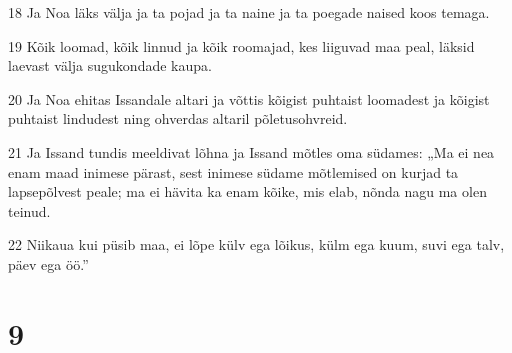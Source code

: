 \par 18 Ja Noa läks välja ja ta pojad ja ta naine ja ta poegade naised koos temaga.
\par 19 Kõik loomad, kõik linnud ja kõik roomajad, kes liiguvad maa peal, läksid laevast välja sugukondade kaupa.
\par 20 Ja Noa ehitas Issandale altari ja võttis kõigist puhtaist loomadest ja kõigist puhtaist lindudest ning ohverdas altaril põletusohvreid.
\par 21 Ja Issand tundis meeldivat lõhna ja Issand mõtles oma südames: „Ma ei nea enam maad inimese pärast, sest inimese südame mõtlemised on kurjad ta lapsepõlvest peale; ma ei hävita ka enam kõike, mis elab, nõnda nagu ma olen teinud.
\par 22 Niikaua kui püsib maa, ei lõpe külv ega lõikus, külm ega kuum, suvi ega talv, päev ega öö.”

\chapter{9}

